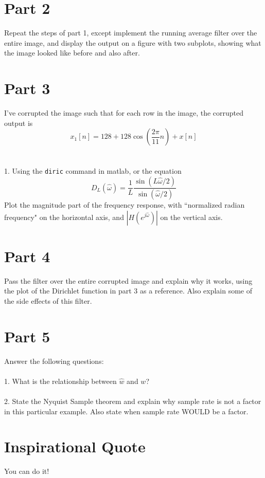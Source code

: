\documentclass[10pt,a4paper]{article}
\begin{document}
\section*{Part 2}
Repeat the steps of part 1, except implement the running average filter over the entire image, and display the output on a figure with two subplots, showing what the image looked like before and also after.  

\section*{Part 3}
I've corrupted the image such that for each row in the image, the corrupted output is
\begin{equation}
x_{1}[n] = 128 + 128\cos(\frac{2 \pi}{11}n) + x[n]
\end{equation}
\\ \\
1.  Using the \texttt{diric} command in matlab, or the equation
\begin{equation*}
D_{L}(\hat{\omega}) = \frac{1}{L}\frac{\sin(L \hat{\omega}/2)}{\sin(\hat{\omega}/2)}
\end{equation*}
Plot the magnitude part of the frequency response, with ``normalized radian frequency" on the horizontal axis, and $|H(e^{j \hat{\omega}})|$ on the vertical axis.

\section*{Part 4}
Pass the filter over the entire corrupted image and explain why it works, using the plot of the Dirichlet function in part 3 as a reference. Also explain some of the side effects of this filter.  

\section*{Part 5}
Answer the following questions:
\\ \\
1.  What is the relationship between $\hat{w}$ and $w$?
\\ \\
2.  State the Nyquist Sample theorem and explain why sample rate is not a factor in this particular example. Also state when sample rate WOULD be a factor.

\section*{Inspirational Quote}
You can do it!
\end{document}
